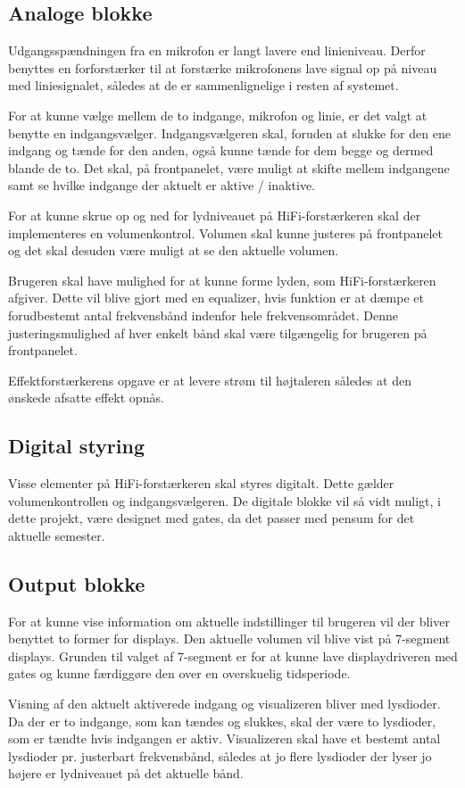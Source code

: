 \subsection*{Analoge blokke}

Udgangsspændningen fra en mikrofon er langt lavere end linieniveau. Derfor benyttes en forforstærker til at forstærke mikrofonens lave signal op på niveau med liniesignalet, således at de er sammenlignelige i resten af systemet.

For at kunne vælge mellem de to indgange, mikrofon og linie, er det valgt at benytte en indgangsvælger. Indgangsvælgeren skal, foruden at slukke for den ene indgang og tænde for den anden, også kunne tænde for dem begge og dermed blande de to. Det skal, på frontpanelet, være muligt at skifte mellem indgangene samt se hvilke indgange der aktuelt er aktive / inaktive. 

For at kunne skrue op og ned for lydniveauet på HiFi-forstærkeren skal der implementeres en volumenkontrol. Volumen skal kunne justeres på frontpanelet og det skal desuden være muligt at se den aktuelle volumen. 

Brugeren skal have mulighed for at kunne forme lyden, som HiFi-forstærkeren afgiver. Dette vil blive gjort med en equalizer, hvis funktion er at dæmpe et forudbestemt antal frekvensbånd indenfor hele frekvensområdet. Denne justeringsmulighed af hver enkelt bånd skal være tilgængelig for brugeren på frontpanelet. 

Effektforstærkerens opgave er at levere strøm til højtaleren således at den ønskede afsatte effekt opnås.

\subsection*{Digital styring}
Visse elementer på HiFi-forstærkeren skal styres digitalt. Dette gælder volumenkontrollen og indgangsvælgeren. De digitale blokke vil så vidt muligt, i dette projekt, være designet med gates, da det passer med pensum for det aktuelle semester. 


\subsection*{Output blokke}

For at kunne vise information om aktuelle indstillinger til brugeren vil der bliver benyttet to former for displays. 
Den aktuelle volumen vil blive vist på 7-segment displays. Grunden til valget af 7-segment er for at kunne lave displaydriveren med gates og kunne færdiggøre den over en overskuelig tidsperiode. 

Visning af den aktuelt aktiverede indgang og visualizeren bliver med lysdioder. Da der er to indgange, som kan tændes og slukkes, skal der være to lysdioder, som er tændte hvis indgangen er aktiv. Visualizeren skal have et bestemt antal lysdioder pr. justerbart frekvensbånd, således at jo flere lysdioder der lyser jo højere er lydniveauet på det aktuelle bånd.